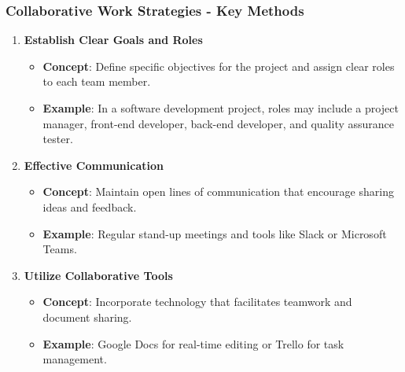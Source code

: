 \documentclass[aspectratio=169]{beamer}
\begin{document}
\begin{frame}[fragile]
    \frametitle{Collaborative Work Strategies - Key Methods}
    \begin{enumerate}
        \item \textbf{Establish Clear Goals and Roles}
        \begin{itemize}
            \item \textbf{Concept}: Define specific objectives for the project and assign clear roles to each team member.
            \item \textbf{Example}: In a software development project, roles may include a project manager, front-end developer, back-end developer, and quality assurance tester.
        \end{itemize}
        
        \item \textbf{Effective Communication}
        \begin{itemize}
            \item \textbf{Concept}: Maintain open lines of communication that encourage sharing ideas and feedback.
            \item \textbf{Example}: Regular stand-up meetings and tools like Slack or Microsoft Teams.
        \end{itemize}
        
        \item \textbf{Utilize Collaborative Tools}
        \begin{itemize}
            \item \textbf{Concept}: Incorporate technology that facilitates teamwork and document sharing.
            \item \textbf{Example}: Google Docs for real-time editing or Trello for task management.
        \end{itemize}
    \end{enumerate}
\end{frame}
\end{document}
